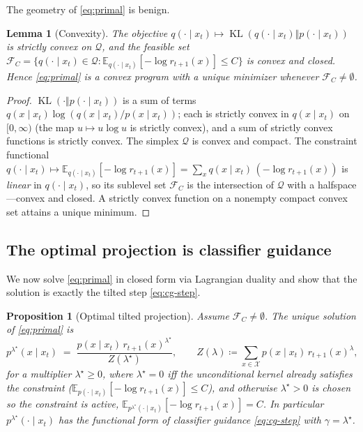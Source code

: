 \documentclass{article}
\newtheorem{proposition}{Proposition}
\newtheorem{lemma}{Lemma}
\DeclareMathOperator{\KL}{KL}
\newcommand{\E}{\mathbb{E}}
\newcommand{\X}{\mathcal{X}}
\newcommand{\Q}{\mathcal{Q}}
\newcommand{\lstar}{\lambda^{\star}}
\begin{document}
The geometry of \eqref{eq:primal} is benign.

\begin{lemma}[Convexity]
\label{lem:convex}
The objective $q(\cdot\mid x_t)\mapsto\KL(q(\cdot\mid x_t)\Vert p(\cdot\mid x_t))$ is strictly convex on $\Q$, and the feasible set
$\mathcal{F}_C=\{q(\cdot\mid x_t)\in\Q:\E_{q(\cdot\mid x_t)}[-\log r_{t+1}(x)]\le C\}$ is convex and closed. Hence \eqref{eq:primal} is a convex program with a unique minimizer whenever $\mathcal{F}_C\neq\emptyset$.
\end{lemma}
\begin{proof}
$\KL(\cdot\Vert p(\cdot\mid x_t))$ is a sum of terms $q(x\mid x_t)\log(q(x\mid x_t)/p(x\mid x_t))$; each is strictly convex in $q(x\mid x_t)$ on $[0,\infty)$ (the map $u\mapsto u\log u$ is strictly convex), and a sum of strictly convex functions is strictly convex. The simplex $\Q$ is convex and compact. The constraint functional $q(\cdot\mid x_t)\mapsto\E_{q(\cdot\mid x_t)}[-\log r_{t+1}(x)]=\sum_x q(x\mid x_t)\,(-\log r_{t+1}(x))$ is \emph{linear} in $q(\cdot\mid x_t)$, so its sublevel set $\mathcal{F}_C$ is the intersection of $\Q$ with a halfspace---convex and closed. A strictly convex function on a nonempty compact convex set attains a unique minimum.
\end{proof}

\subsection{The optimal projection is classifier guidance}
We now solve \eqref{eq:primal} in closed form via Lagrangian duality and show that the solution is exactly the tilted step \eqref{eq:cg-step}.

\begin{proposition}[Optimal tilted projection]
\label{prop:tilt}
Assume $\mathcal{F}_C\neq\emptyset$. The unique solution of \eqref{eq:primal} is
\begin{equation}
\label{eq:qlam}
p^{\lstar}(x\mid x_t)\;=\;\frac{p(x\mid x_t)\,r_{t+1}(x)^{\lstar}}{Z(\lstar)},
\qquad
Z(\lambda)\coloneqq\sum_{x\in\X}p(x\mid x_t)\,r_{t+1}(x)^{\lambda},
\end{equation}
for a multiplier $\lstar\ge 0$, where $\lstar=0$ iff the unconditional kernel already satisfies the constraint ($\E_{p(\cdot\mid x_t)}[-\log r_{t+1}(x)]\le C$), and otherwise $\lstar>0$ is chosen so the constraint is active, $\E_{p^{\lstar}(\cdot\mid x_t)}[-\log r_{t+1}(x)]=C$. In particular $p^{\lstar}(\cdot\mid x_t)$ has the functional form of classifier guidance \eqref{eq:cg-step} with $\gamma=\lstar$.
\end{proposition}
\end{document}

